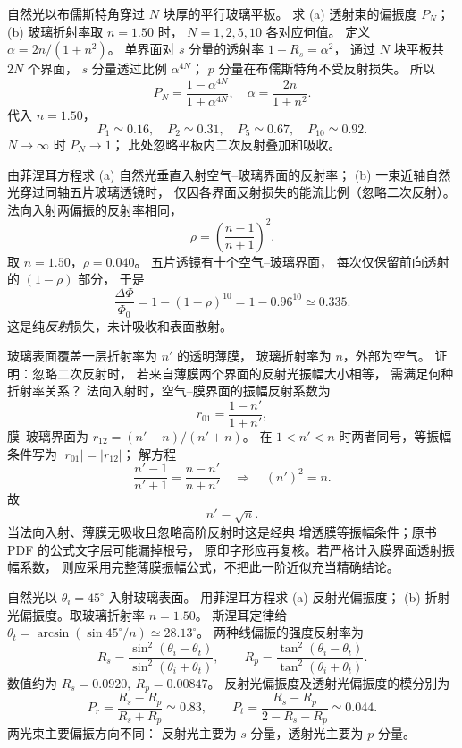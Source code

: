 自然光以布儒斯特角穿过 $N$ 块厚的平行玻璃平板。
求 (a) 透射束的偏振度 $P_N$；
(b) 玻璃折射率取 $n=1.50$ 时，
$N=1,2,5,10$ 各对应何值。
\exsolution
定义 $\alpha=2n/(1+n^2)$。
单界面对 $s$ 分量的透射率
$1-R_s=\alpha^2$，
通过 $N$ 块平板共 $2N$ 个界面，
$s$ 分量透过比例 $\alpha^{4N}$；
$p$ 分量在布儒斯特角不受反射损失。
所以
\[
 \boxed{P_N=\frac{1-\alpha^{4N}}{1+\alpha^{4N}},
 \quad \alpha=\frac{2n}{1+n^2}}.
\]
代入 $n=1.50$，
\[
 \boxed{P_1\simeq0.16,\quad P_2\simeq0.31,\quad
 P_5\simeq0.67,\quad P_{10}\simeq0.92}.
\]
\excheck $N\to\infty$ 时 $P_N\to1$；
此处忽略平板内二次反射叠加和吸收。

由菲涅耳方程求 (a) 自然光垂直入射空气--玻璃界面的反射率；
(b) 一束近轴自然光穿过同轴五片玻璃透镜时，
仅因各界面反射损失的能流比例（忽略二次反射）。
\exsolution
法向入射两偏振的反射率相同，
\[
 \boxed{\rho=\left(\frac{n-1}{n+1}\right)^2}.
\]
取 $n=1.50$，$\rho=0.040$。
五片透镜有十个空气--玻璃界面，
每次仅保留前向透射的 $(1-\rho)$ 部分，
于是
\[
 \boxed{\frac{\Delta\Phi}{\Phi_0}
 =1-(1-\rho)^{10}
 =1-0.96^{10}\simeq0.335}.
\]
\excheck 这是纯\emph{反射}损失，未计吸收和表面散射。

玻璃表面覆盖一层折射率为 $n'$ 的透明薄膜，
玻璃折射率为 $n$，外部为空气。
证明：忽略二次反射时，
若来自薄膜两个界面的反射光振幅大小相等，
需满足何种折射率关系？
\exsolution
法向入射时，空气--膜界面的振幅反射系数为
\[
 r_{01}=\frac{1-n'}{1+n'},
\]
膜--玻璃界面为 $r_{12}=(n'-n)/(n'+n)$。
在 $1<n'<n$ 时两者同号，等振幅条件写为
$|r_{01}|=|r_{12}|$；
解方程
\[
 \frac{n'-1}{n'+1}=\frac{n-n'}{n+n'}
 \quad\Longrightarrow\quad (n')^2=n.
\]
故
\[
 \boxed{n'=\sqrt n}.
\]
\excheck 当法向入射、薄膜无吸收且忽略高阶反射时这是经典
增透膜等振幅条件；原书 PDF 的公式文字层可能漏掉根号，
原印字形应再复核。若严格计入膜界面透射振幅系数，
则应采用完整薄膜振幅公式，不把此一阶近似充当精确结论。

自然光以 $\theta_i=45^\circ$ 入射玻璃表面。
用菲涅耳方程求 (a) 反射光偏振度；
(b) 折射光偏振度。取玻璃折射率 $n=1.50$。
\exsolution
斯涅耳定律给
$\theta_t=\arcsin(\sin45^\circ/n)\simeq28.13^\circ$。
两种线偏振的强度反射率为
\[
 R_s=\frac{\sin^2(\theta_i-\theta_t)}
 {\sin^2(\theta_i+\theta_t)},\qquad
 R_p=\frac{\tan^2(\theta_i-\theta_t)}
 {\tan^2(\theta_i+\theta_t)}.
\]
数值约为 $R_s=0.0920,\ R_p=0.00847$。
反射光偏振度及透射光偏振度的模分别为
\[
 \boxed{P_r=\frac{R_s-R_p}{R_s+R_p}\simeq0.83},
 \qquad
 \boxed{P_t=\frac{R_s-R_p}{2-R_s-R_p}\simeq0.044}.
\]
\excheck 两光束主要偏振方向不同：
反射光主要为 $s$ 分量，透射光主要为 $p$ 分量。

